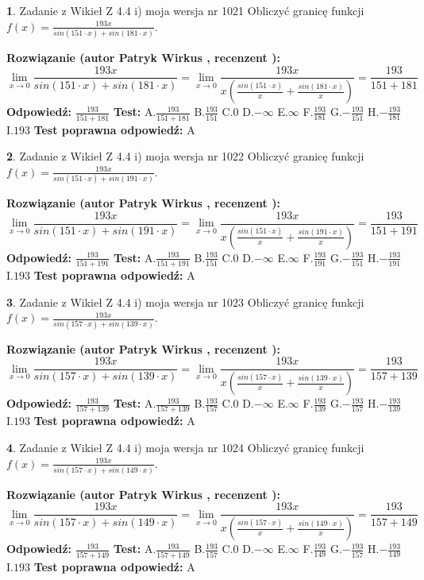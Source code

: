 \documentclass[12pt, a4paper]{article}
\theoremstyle{definition} %
\newtheorem{zad}{}
\newcommand{\zadStart}[1]{\begin{zad}#1\newline}
\newcommand{\zadStop}{\end{zad}}
\newcommand{\rozwStart}[2]{\noindent \textbf{Rozwiązanie (autor #1 , recenzent #2): }\newline}
\newcommand{\rozwStop}{\newline}
\newcommand{\odpStart}{\noindent \textbf{Odpowiedź:}\newline}
\newcommand{\odpStop}{\newline}
\newcommand{\testStart}{\noindent \textbf{Test:}\newline}
\newcommand{\testStop}{\newline}
\newcommand{\kluczStart}{\noindent \textbf{Test poprawna odpowiedź:}\newline}
\newcommand{\kluczStop}{\newline}
\begin{document}
\zadStart{Zadanie z Wikieł Z 4.4 i) moja wersja nr 1021}
Obliczyć granicę funkcji $f(x)=\frac{193x}{sin(151\cdot x) +sin(181\cdot x)}$.
\zadStop
\rozwStart{Patryk Wirkus}{}
$$\lim\limits_{x\to 0}\frac{193x}{sin(151\cdot x) +sin(181\cdot x)}=\lim\limits_{x\to 0}\frac{193x}{x(\frac{sin(151\cdot x)}{x}+\frac{sin(181\cdot x)}{x})}=\frac{193}{151+181}$$
\rozwStop
\odpStart
$\frac{193}{151+181}$
\odpStop
\testStart
A.$\frac{193}{151+181}$
B.$\frac{193}{151}$
C.$0$
D.$-\infty$
E.$\infty$
F.$\frac{193}{181}$
G.$-\frac{193}{151}$
H.$-\frac{193}{181}$
I.$193$
\testStop
\kluczStart
A
\kluczStop



\zadStart{Zadanie z Wikieł Z 4.4 i) moja wersja nr 1022}
Obliczyć granicę funkcji $f(x)=\frac{193x}{sin(151\cdot x) +sin(191\cdot x)}$.
\zadStop
\rozwStart{Patryk Wirkus}{}
$$\lim\limits_{x\to 0}\frac{193x}{sin(151\cdot x) +sin(191\cdot x)}=\lim\limits_{x\to 0}\frac{193x}{x(\frac{sin(151\cdot x)}{x}+\frac{sin(191\cdot x)}{x})}=\frac{193}{151+191}$$
\rozwStop
\odpStart
$\frac{193}{151+191}$
\odpStop
\testStart
A.$\frac{193}{151+191}$
B.$\frac{193}{151}$
C.$0$
D.$-\infty$
E.$\infty$
F.$\frac{193}{191}$
G.$-\frac{193}{151}$
H.$-\frac{193}{191}$
I.$193$
\testStop
\kluczStart
A
\kluczStop



\zadStart{Zadanie z Wikieł Z 4.4 i) moja wersja nr 1023}
Obliczyć granicę funkcji $f(x)=\frac{193x}{sin(157\cdot x) +sin(139\cdot x)}$.
\zadStop
\rozwStart{Patryk Wirkus}{}
$$\lim\limits_{x\to 0}\frac{193x}{sin(157\cdot x) +sin(139\cdot x)}=\lim\limits_{x\to 0}\frac{193x}{x(\frac{sin(157\cdot x)}{x}+\frac{sin(139\cdot x)}{x})}=\frac{193}{157+139}$$
\rozwStop
\odpStart
$\frac{193}{157+139}$
\odpStop
\testStart
A.$\frac{193}{157+139}$
B.$\frac{193}{157}$
C.$0$
D.$-\infty$
E.$\infty$
F.$\frac{193}{139}$
G.$-\frac{193}{157}$
H.$-\frac{193}{139}$
I.$193$
\testStop
\kluczStart
A
\kluczStop



\zadStart{Zadanie z Wikieł Z 4.4 i) moja wersja nr 1024}
Obliczyć granicę funkcji $f(x)=\frac{193x}{sin(157\cdot x) +sin(149\cdot x)}$.
\zadStop
\rozwStart{Patryk Wirkus}{}
$$\lim\limits_{x\to 0}\frac{193x}{sin(157\cdot x) +sin(149\cdot x)}=\lim\limits_{x\to 0}\frac{193x}{x(\frac{sin(157\cdot x)}{x}+\frac{sin(149\cdot x)}{x})}=\frac{193}{157+149}$$
\rozwStop
\odpStart
$\frac{193}{157+149}$
\odpStop
\testStart
A.$\frac{193}{157+149}$
B.$\frac{193}{157}$
C.$0$
D.$-\infty$
E.$\infty$
F.$\frac{193}{149}$
G.$-\frac{193}{157}$
H.$-\frac{193}{149}$
I.$193$
\testStop
\kluczStart
A
\kluczStop
\end{document}
